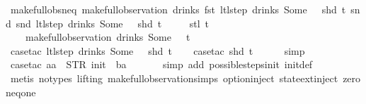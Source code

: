 \begin{isabellebody}
\isamarkupfalse%
%
\endisatagproof
{\isafoldproof}%
%
\isadelimproof
\isanewline
%
\endisadelimproof
\isanewline
{}\isamarkupfalse%
\ make{\isacharunderscore}full{\isacharunderscore}obs{\isacharunderscore}neq{\isacharcolon}\ {\isachardoublequoteopen}make{\isacharunderscore}full{\isacharunderscore}observation\ drinks\ {\isacharparenleft}fst\ {\isacharparenleft}ltl{\isacharunderscore}step\ drinks\ {\isacharparenleft}Some\ {}{\isacharparenright}\ {\isacharless}{\isachargreater}\ {\isacharparenleft}shd\ t{\isacharparenright}{\isacharparenright}{\isacharparenright}\ {\isacharparenleft}snd\ {\isacharparenleft}snd\ {\isacharparenleft}ltl{\isacharunderscore}step\ drinks\ {\isacharparenleft}Some\ {}{\isacharparenright}\ {\isacharless}{\isachargreater}\ {\isacharparenleft}shd\ t{\isacharparenright}{\isacharparenright}{\isacharparenright}{\isacharparenright}\isanewline
\ \ \ \ \ {\isacharparenleft}stl\ t{\isacharparenright}\ {\isasymnoteq}\isanewline
\ \ \ \ make{\isacharunderscore}full{\isacharunderscore}observation\ drinks\ {\isacharparenleft}Some\ {}{\isacharparenright}\ {\isacharless}{\isachargreater}\ t{\isachardoublequoteclose}\isanewline
%
\isadelimproof
\ \ %
\endisadelimproof
%
\isatagproof
{}\isamarkupfalse%
\ {\isacharparenleft}case{\isacharunderscore}tac\ {\isachardoublequoteopen}ltl{\isacharunderscore}step\ drinks\ {\isacharparenleft}Some\ {}{\isacharparenright}\ {\isacharless}{\isachargreater}\ {\isacharparenleft}shd\ t{\isacharparenright}{\isachardoublequoteclose}{\isacharparenright}\isanewline
\ \ \isamarkupfalse%
\ {\isacharparenleft}case{\isacharunderscore}tac\ {\isachardoublequoteopen}shd\ t{\isachardoublequoteclose}{\isacharparenright}\isanewline
\ \ \ \ \isamarkupfalse%
\ simp\isanewline
\ \ \ \ \isamarkupfalse%
\ {\isacharparenleft}case{\isacharunderscore}tac\ {\isachardoublequoteopen}aa\ {\isacharequal}\ STR\ {\isacharprime}{\isacharprime}init{\isacharprime}{\isacharprime}\ {\isasymand}\ ba\ {\isacharequal}\ {\isacharbrackleft}{\isacharbrackright}{\isachardoublequoteclose}{\isacharparenright}\isanewline
\ \ \ \isamarkupfalse%
\ {\isacharparenleft}simp\ add{\isacharcolon}\ possible{\isacharunderscore}steps{\isacharunderscore}init\ init{\isacharunderscore}def{\isacharparenright}\isanewline
\ \ \isamarkupfalse%
\ {\isacharparenleft}metis\ {\isacharparenleft}no{\isacharunderscore}types{\isacharcomma}\ lifting{\isacharparenright}\ make{\isacharunderscore}full{\isacharunderscore}observation{\isachardot}simps{\isacharparenleft}{}{\isacharparenright}\ option{\isachardot}inject\ state{\isachardot}ext{\isacharunderscore}inject\ zero{\isacharunderscore}neq{\isacharunderscore}one{\isacharparenright}\isanewline

\end{isabellebody}
